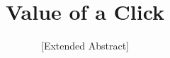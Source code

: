 \documentclass{acm_proc_article-sp}
\begin{document}
\title{Value of a Click}
\subtitle{[Extended Abstract]}
%
%
%
%
%
\end{document}
